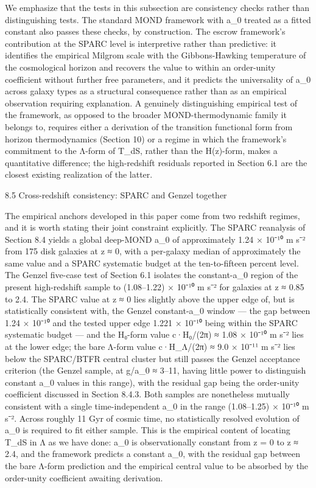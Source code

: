 \documentclass[11pt]{article}
\begin{document}
We emphasize that the tests in this subsection are consistency checks rather than distinguishing tests. The standard MOND framework with a\_0 treated as a fitted constant also passes these checks, by construction. The escrow framework's contribution at the SPARC level is interpretive rather than predictive: it identifies the empirical Milgrom scale with the Gibbons-Hawking temperature of the cosmological horizon and recovers the value to within an order-unity coefficient without further free parameters, and it predicts the universality of a\_0 across galaxy types as a structural consequence rather than as an empirical observation requiring explanation. A genuinely distinguishing empirical test of the framework, as opposed to the broader MOND-thermodynamic family it belongs to, requires either a derivation of the transition functional form from horizon thermodynamics (Section 10) or a regime in which the framework's commitment to the Λ-form of T\_dS, rather than the H(z)-form, makes a quantitative difference; the high-redshift residuals reported in Section 6.1 are the closest existing realization of the latter.

8.5 Cross-redshift consistency: SPARC and Genzel together

The empirical anchors developed in this paper come from two redshift regimes, and it is worth stating their joint constraint explicitly. The SPARC reanalysis of Section 8.4 yields a global deep-MOND a\_0 of approximately 1.24 × 10⁻¹⁰ m s⁻² from 175 disk galaxies at z ≈ 0, with a per-galaxy median of approximately the same value and a SPARC systematic budget at the ten-to-fifteen percent level. The Genzel five-case test of Section 6.1 isolates the constant-a\_0 region of the present high-redshift sample to (1.08--1.22) × 10⁻¹⁰ m s⁻² for galaxies at z ≈ 0.85 to 2.4. The SPARC value at z ≈ 0 lies slightly above the upper edge of, but is statistically consistent with, the Genzel constant-a\_0 window --- the gap between 1.24 × 10⁻¹⁰ and the tested upper edge 1.221 × 10⁻¹⁰ being within the SPARC systematic budget --- and the H₀-form value c·H₀/(2π) ≈ 1.08 × 10⁻¹⁰ m s⁻² lies at the lower edge; the bare Λ-form value c·H\_Λ/(2π) ≈ 9.0 × 10⁻¹¹ m s⁻² lies below the SPARC/BTFR central cluster but still passes the Genzel acceptance criterion (the Genzel sample, at g/a\_0 ≈ 3--11, having little power to distinguish constant a\_0 values in this range), with the residual gap being the order-unity coefficient discussed in Section 8.4.3. Both samples are nonetheless mutually consistent with a single time-independent a\_0 in the range (1.08--1.25) × 10⁻¹⁰ m s⁻². Across roughly 11 Gyr of cosmic time, no statistically resolved evolution of a\_0 is required to fit either sample. This is the empirical content of locating T\_dS in Λ as we have done: a\_0 is observationally constant from z = 0 to z ≈ 2.4, and the framework predicts a constant a\_0, with the residual gap between the bare Λ-form prediction and the empirical central value to be absorbed by the order-unity coefficient awaiting derivation.
\end{document}
